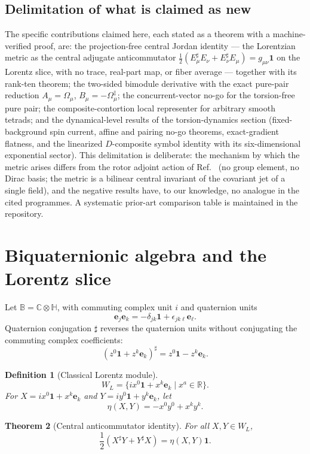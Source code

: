 \documentclass[12pt,a4paper]{article}
\newtheorem{definition}{Definition}[section]
\newtheorem{theorem}[definition]{Theorem}
\theoremstyle{remark}\newtheorem{remark}[definition]{Remark}
\newcommand{\B}{\mathbb B}
\newcommand{\R}{\mathbb R}
\begin{document}
\subsection*{Delimitation of what is claimed as new}
The specific contributions claimed here, each stated as a theorem with a
machine-verified proof, are: the projection-free central Jordan identity
--- the Lorentzian metric as the central adjugate anticommutator
$\tfrac12(E_\mu^\sharp E_\nu+E_\nu^\sharp E_\mu)=g_{\mu\nu}\mathbf1$
on the Lorentz slice, with no trace, real-part map, or fiber average ---
together with its rank-ten theorem; the two-sided bimodule derivative with
the exact pure-pair reduction $A_\mu=\Omega_\mu$,
$B_\mu=-\Omega_\mu^\ddagger$; the concurrent-vector no-go for the
torsion-free pure pair; the composite-contortion local representer for
arbitrary smooth tetrads; and the dynamical-level results of the
torsion-dynamics section (fixed-background spin current, affine and
pairing no-go theorems, exact-gradient flatness, and the linearized
$D$-composite symbol identity with its six-dimensional exponential
sector).  This delimitation is deliberate: the
mechanism by which the metric arises differs from the rotor adjoint action
of Ref.~\cite{dehaas2025} (no group element, no Dirac basis; the metric is
a bilinear central invariant of the covariant jet of a single field), and
the negative results have, to our knowledge, no analogue in the cited
programmes.  A systematic prior-art comparison table is maintained in the
repository.

\section{Biquaternionic algebra and the Lorentz slice}
Let $\B=\mathbb C\otimes\mathbb H$, with commuting complex unit $i$ and
quaternion units
\[
 \mathbf e_j\mathbf e_k=-\delta_{jk}\mathbf1
 +\epsilon_{jk\ell}\mathbf e_\ell.
\]
Quaternion conjugation $\sharp$ reverses the quaternion units without
conjugating the commuting complex coefficients:
\[
 (z^0\mathbf1+z^k\mathbf e_k)^\sharp
 =z^0\mathbf1-z^k\mathbf e_k.
\]

\begin{definition}[Classical Lorentz module]
\[
 W_L=\{i x^0\mathbf1+x^k\mathbf e_k\mid x^a\in\R\}.
\]
For $X=i x^0\mathbf1+x^k\mathbf e_k$ and
$Y=i y^0\mathbf1+y^k\mathbf e_k$, let
\[
 \eta(X,Y)=-x^0y^0+x^ky^k.
\]
\end{definition}

\begin{theorem}[Central anticommutator identity]
For all $X,Y\in W_L$,
\begin{equation}
 \boxed{\frac12(X^\sharp Y+Y^\sharp X)=\eta(X,Y)\mathbf1.}
 \label{eq:central}
\end{equation}
\end{theorem}
\end{document}
